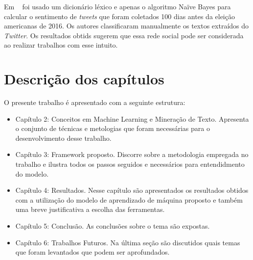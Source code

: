 Em ~\cite{joyce} foi usado um dicionário léxico e apenas o algoritmo Naïve Bayes para calcular o sentimento de \textit{tweets} que foram coletados 100 dias antes da eleição americanas
de 2016. Os autores classificaram manualmente os textos extraídos do \textit{Twitter}. Os resultados obtids sugerem que essa rede social pode ser considerada ao realizar 
trabalhos com esse intuito.


\section{Descrição dos capítulos}

O presente trabalho é apresentado com a seguinte estrutura:

\begin{itemize}
	\item Capítulo 2: Conceitos em Machine Learning e Mineração de Texto. Apresenta o conjunto de técnicas
	      e metologias que foram necessárias para o desenvolvimento desse trabalho.
	\item Capítulo 3: Framework proposto. Discorre sobre a metodologia empregada no trabalho e ilustra todos os passos
	      seguidos e necessários para entendidmento do modelo.
	\item Capítulo 4: Resultados. Nesse capítulo são apresentados os resultados obtidos com a utilização do modelo de aprendizado 
	      de máquina proposto e também uma breve justificativa a escolha das ferramentas.
	\item Capítulo 5: Conclusão. As conclusões sobre o tema são expostas.
	\item Capítulo 6: Trabalhos Futuros. Na última seção são discutidos quais temas que foram levantados que podem ser aprofundados.
\end{itemize}